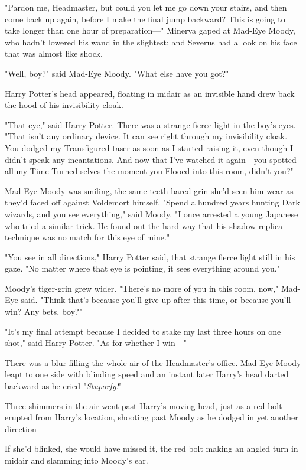 "Pardon me, Headmaster, but could you let me go down your stairs, and then come 
back up again, before I make the final jump backward? This is going to take 
longer than one hour of preparation---"
\sbreak
Minerva gaped at Mad-Eye Moody, who hadn't lowered his wand in the slightest; 
and Severus had a look on his face that was almost like shock.

"Well, boy?" said Mad-Eye Moody. "What else have you got?"

Harry Potter's head appeared, floating in midair as an invisible hand drew back 
the hood of his invisibility cloak.

"That eye," said Harry Potter. There was a strange fierce light in the boy's 
eyes. "That isn't any ordinary device. It can see right through my invisibility 
cloak. You dodged my Transfigured taser as soon as I started raising it, even 
though I didn't speak any incantations. And now that I've watched it 
again---you spotted all my Time-Turned selves the moment you Flooed into this 
room, didn't you?"

Mad-Eye Moody was smiling, the same teeth-bared grin she'd seen him wear as 
they'd faced off against Voldemort himself. "Spend a hundred years hunting Dark 
wizards, and you see everything," said Moody. "I once arrested a young Japanese 
who tried a similar trick. He found out the hard way that his shadow replica 
technique was no match for this eye of mine."

"You see in all directions," Harry Potter said, that strange fierce light still 
in his gaze. "No matter where that eye is pointing, it sees everything around 
you."

Moody's tiger-grin grew wider. "There's no more of you in this room, now," 
Mad-Eye said. "Think that's because you'll give up after this time, or because 
you'll win? Any bets, boy?"

"It's my final attempt because I decided to stake my last three hours on one 
shot," said Harry Potter. "As for whether I win---"

There was a blur filling the whole air of the Headmaster's office. Mad-Eye 
Moody leapt to one side with blinding speed and an instant later Harry's head 
darted backward as he cried "\emph{Stuporfy!}"

Three shimmers in the air went past Harry's moving head, just as a red bolt 
erupted from Harry's location, shooting past Moody as he dodged in yet another 
direction---

If she'd blinked, she would have missed it, the red bolt making an angled turn 
in midair and slamming into Moody's ear.

